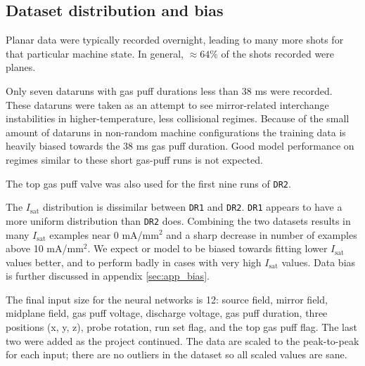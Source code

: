 \subsection{Dataset distribution and bias}

Planar data were typically recorded overnight, leading to many more shots for that particular machine state. In general, $\approx 64\%$ of the shots recorded were planes. 

Only seven dataruns with gas puff durations less than 38 ms were recorded. These dataruns were taken as an attempt to see mirror-related interchange instabilities in higher-temperature, less collisional regimes. Because of the small amount of dataruns in non-random machine configurations the training data is heavily biased towards the 38 ms gas puff duration. Good model performance on regimes similar to these short gas-puff runs is not expected.

The top gas puff valve was also used for the first nine runs of \texttt{DR2}.

The $I_\text{sat}$ distribution is dissimilar between \texttt{DR1} and \texttt{DR2}. \texttt{DR1} appears to have a more uniform distribution than \texttt{DR2} does. Combining the two datasets results in many $I_\text{sat}$ examples near 0 mA/mm$^2$ and a sharp decrease in number of examples above 10 mA/mm$^2$. We expect or model to be biased towards fitting lower $I_\text{sat}$ values better, and to perform badly in cases with very high $I_\text{sat}$ values. Data bias is further discussed in appendix \ref{sec:app_bias}.

The final input size for the neural networks is 12: source field, mirror field, midplane field, gas puff voltage, discharge voltage, gas puff duration, three positions (x, y, z), probe rotation, run set flag, and the top gas puff flag. The last two were added as the project continued. The data are scaled to the peak-to-peak for each input; there are no outliers in the dataset so all scaled values are sane.



